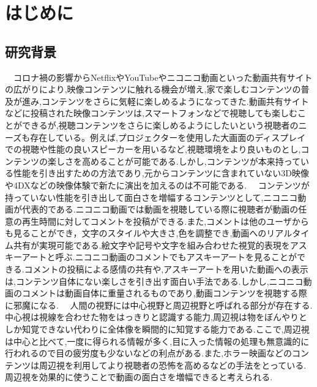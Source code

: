 \chapter{はじめに}
\thispagestyle{myheadings}

\section{研究背景}
　コロナ禍の影響からNetflixやYouTubeやニコニコ動画といった動画共有サイトの広がりにより,映像コンテンツに触れる機会が増え,家で楽しむコンテンツの普及が進み,コンテンツをさらに気軽に楽しめるようになってきた.動画共有サイトなどに投稿された映像コンテンツは,スマートフォンなどで視聴しても楽しむことができるが,視聴コンテンツをさらに楽しめるようにしたいという視聴者のニーズも存在している。例えば,プロジェクターを使用した大画面のディスプレイでの視聴や性能の良いスピーカーを用いるなど,視聴環境をより良いものとし,コンテンツの楽しさを高めることが可能である.しかし,コンテンツが本来持っている性能を引き出すための方法であり,元からコンテンツに含まれていない3D映像や4DXなどの映像体験で新たに演出を加えるのは不可能である.
　コンテンツが持っていない性能を引き出して面白さを増幅するコンテンツとして,ニコニコ動画が代表的である.ニコニコ動画では動画を視聴している際に視聴者が動画の任意の再生時間に対してコメントを投稿ができる.また,コメントは他のユーザからも見ることができ，文字のスタイルや大きさ,色を調整でき,動画へのリアルタイム共有が実現可能である.絵文字や記号や文字を組み合わせた視覚的表現をアスキーアートと呼ぶ.ニコニコ動画のコメントでもアスキーアートを見ることができる.コメントの投稿による感情の共有や,アスキーアートを用いた動画への表示は,コンテンツ自体にない楽しさを引き出す面白い手法である.しかし,ニコニコ動画のコメントは動画自体に重量されるものであり,動画コンテンツを視聴する際に邪魔になる.
　人間の視野には中心視野と周辺視野と呼ばれる部分が存在する.中心視は視線を合わせた物をはっきりと認識する能力,周辺視は物をぼんやりとしか知覚できない代わりに全体像を瞬間的に知覚する能力である.ここで,周辺視は中心と比べて,一度に得られる情報が多く,目に入った情報の処理も無意識的に行われるので目の疲労度も少ないなどの利点がある.また,ホラー映画などのコンテンツは周辺視を利用してより視聴者の恐怖を高めるなどの手法をとっている.周辺視を効果的に使うことで動画の面白さを増幅できると考えられる.



